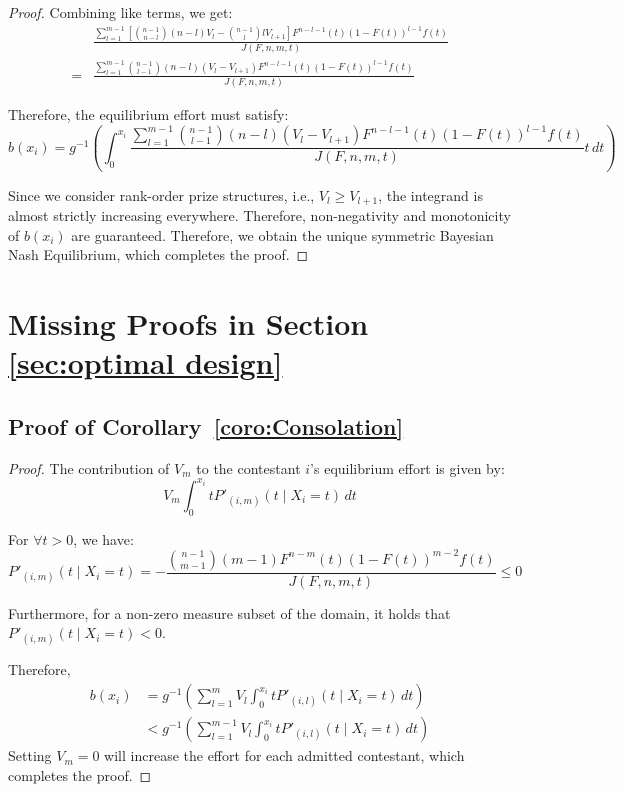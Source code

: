 \begin{proof}
Combining like terms, we get:
\[
\begin{aligned}
& \frac{\sum_{l=1}^{m-1}\left [ \binom{n-1}{n-l}(n-l)V_l - \binom{n-1}{l}lV_{l+1}\right ]F^{n-l-1}(t)(1-F(t))^{l-1}f(t)}{J(F,n,m,t)} \\
= & \frac{\sum_{l=1}^{m-1}\binom{n-1}{l-1}(n-l)(V_l-V_{l+1})F^{n-l-1}(t)(1-F(t))^{l-1}f(t)}{J(F,n,m,t)}
\end{aligned}
\]

Therefore, the equilibrium effort must satisfy:
\begin{equation}\label{eq:EquEffort}
        b(x_i) = g^{-1}\left(\int_{0}^{x_i}\frac{\sum_{l=1}^{m-1}\binom{n-1}{l-1}(n-l)(V_l-V_{l+1})F^{n-l-1}(t)(1-F(t))^{l-1}f(t)}{J(F,n,m,t)} t\, dt \right)
\end{equation}

Since we consider rank-order prize structures, i.e., \( V_l \geq V_{l+1}\), the integrand is almost strictly increasing everywhere. Therefore, non-negativity and monotonicity of \( b(x_i) \) are guaranteed. Therefore, we obtain the unique symmetric Bayesian Nash Equilibrium, which completes the proof.
\end{proof}


\section{Missing Proofs in Section \ref{sec:optimal design}}

\subsection*{Proof of Corollary~\ref{coro:Consolation}}
\begin{proof}
    The contribution of \( V_m \) to the contestant $i$'s equilibrium effort is given by:
    \[
    V_m \int_{0}^{x_i} t P'_{(i,m)}(t \mid X_i = t) \, dt
    \]
    
    For \( \forall t > 0 \), we have:
    \[
    P'_{(i,m)}(t \mid X_i = t) = - \frac{\binom{n-1}{m-1}(m-1)F^{n-m}(t)(1-F(t))^{m-2}f(t)}{J(F,n,m,t)} \leq 0
    \]
    
    Furthermore, for a non-zero measure subset of the domain, it holds that \( P'_{(i,m)}(t \mid X_i = t) < 0 \).

    Therefore,
    \begin{align*}
    b(x_i) & = g^{-1} \left( \sum_{l=1}^{m} V_l \int_{0}^{x_i} t P'_{(i,l)}(t \mid X_i = t) \, dt \right) \\
           & < g^{-1} \left( \sum_{l=1}^{m-1} V_l \int_{0}^{x_i} t P'_{(i,l)}(t \mid X_i = t) \, dt \right)
    \end{align*}
    Setting \( V_m = 0 \) will increase the effort for each admitted contestant, which completes the proof. 
\end{proof}



